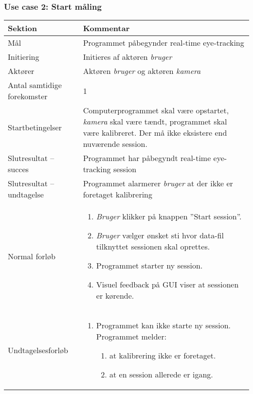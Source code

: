 \documentclass[kravspec.tex]{subfiles}
\begin{document}
	\subsubsection{Use case 2: Start måling}
	\begin{tabular}{|l|p{7.7cm}|}
		\hline \textbf{Sektion} 	& \textbf{Kommentar} \\ 
		\hline Mål  & Programmet påbegynder real-time eye-tracking \\ 
		\hline Initiering  & Initieres af aktøren \textit{bruger} \\ 
		\hline Aktører & Aktøren \textit{bruger} og aktøren \textit{kamera} \\ 
		\hline Antal samtidige forekomster & 1 \\ 
		\hline Startbetingelser & Computerprogrammet skal være opstartet, \textit{kamera} skal være tændt, programmet skal være kalibreret. Der må ikke eksistere end nuværende session.  \\ 
		\hline Slutresultat – succes & Programmet har påbegyndt real-time eye-tracking session\\ 
		\hline Slutresultat – undtagelse & Programmet alarmerer \textit{bruger} at der ikke er foretaget kalibrering \\ 
		\hline Normal forløb & \begin{enumerate}
			\item \textit{Bruger} klikker på knappen ”Start session”.
			\item \textit{Bruger} vælger ønsket sti hvor data-fil tilknyttet sessionen skal oprettes. 
			\item Programmet starter ny session.
			\item Visuel feedback på GUI viser at sessionen er kørende.
		\end{enumerate} \\  
		\hline Undtagelsesforløb & \begin{enumerate}
			\item Programmet kan ikke starte ny session. Programmet melder:
			\begin{enumerate}
				\item at kalibrering ikke er foretaget.
				\item at en session allerede er igang. 
			\end{enumerate}
		\end{enumerate} \\ 
		\hline 
	\end{tabular}
	
\end{document}
